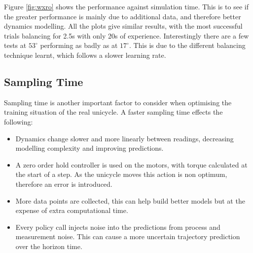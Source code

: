 \documentclass[twoside,twocolumn,12pt]{article}
\begin{document}
\newline
Figure \ref{fig:wxro} shows the performance against simulation time. This is to see if the greater performance is mainly due to additional data, and therefore better dynamics modelling. All the plots give similar results, with the most successful trials balancing for 2.5s with only 20s of experience. Interestingly there are a few tests at $53^{\circ}$ performing as badly as at $17^{\circ}$. This is due to the different balancing technique learnt, which follows a slower learning rate.

\subsection{Sampling Time}
Sampling time is another important factor to consider when optimising the training situation of the real unicycle. A faster sampling time effects the following:

\begin{itemize}
\item Dynamics change slower and more linearly between readings, decreasing modelling complexity and improving predictions.
\item A zero order hold controller is used on the motors, with torque calculated at the start of a step. As the unicycle moves this action is non optimum, therefore an error is introduced.
\item More data points are collected, this can help build better models but at the expense of extra computational time.
\item Every policy call injects noise into the predictions from process and measurement noise. This can cause a more uncertain trajectory prediction over the horizon time.
\end{itemize}
\end{document}
